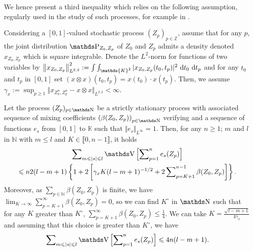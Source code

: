We hence present a third inequality which relies on the following assumption, regularly used in the study of such processes, for example in .

\begin{as}\label{AS_MARGINS_INTRO_DATA_REGULAR}
Considering a $[0, 1]$-valued stochastic process $(Z_{p})_{p \in \mathds{Z}}$, assume that for any $p$, the joint distribution $\P_{Z_{0}, Z_{p}}$ of $Z_{0}$ and $Z_{p}$ admits a density denoted $x_{Z_{0}, Z_{p}}$ which is square integrable.
Denote the $L^{2}$-norm for functions of two variables by
$\left\Vert x_{Z_{0}, Z_{p}}\right\Vert_{L^{2, 2}}^{2} := \int\int_{\mathds{K}^{2}} \vert x_{Z_{0}, Z_{p}}(t_{0}, t_{p})\vert^{2} \d t_{0} \d t_{p}$ and for any $t_{0}$ and $t_{p}$ in $[0, 1]$ set $(x \otimes x)(t_{0}, t_{p}) = x(t_{0}) \cdot x(t_{p})$.
Then, we assume $\gamma_{x} := \sup\nolimits_{p \geq 1} \Vert x_{Z_{0}^{n}, Z_{p}^{n}} - x \otimes x \Vert_{L^{2, 2}} < \infty$.
\assEnd
\end{as}

\begin{lm}\label{LM_DEPENDENTDATA_VARIANCEBOUNDIII}
Let the process $(Z_{p})_{p \in \N}$ be a strictly stationary process with associated sequence of mixing coefficients $\left(\beta(Z_{0}, Z_{p})\right)_{p \in \N}$ verifying  and a sequence of functions $e_{s}$ from $[0, 1]$ to $\mathds{K}$ such that $\Vert e_{s} \Vert_{L^{\infty}} = 1$.
Then, for any $n \geq 1$; $m$ and $l$ in $\mathds{N}$ with $m \leq l$ and $K \in \llbracket 0, n-1\rrbracket$, it holds
\begin{multline*}
\sum\nolimits_{m \leq \vert s \vert \leq l} \V\left[\sum\nolimits_{p = 1}^{n} e_{s}(Z_{p})\right]\\
\leq n 2 (l-m+1) \left\{1 + 2\left[\gamma_{x} K(l-m+1)^{-1/2} + 2 \sum\nolimits_{p = K + 1}^{n - 1} \beta(Z_{0}, Z_{p})\right]\right\}.
\end{multline*}
Moreover, as $\sum\nolimits_{p \in \mathds{N}} \beta(Z_{0}, Z_{p})$ is finite, we have $\lim\nolimits_{K \rightarrow \infty} \sum\nolimits_{p = K + 1}^{\infty} \beta(Z_{0}, Z_{p}) = 0$, so we can find $K^{\circ}$ in $\N$ such that for any $K$ greater than $K^{\circ}$, $\sum\nolimits_{p = K + 1}^{\infty} \beta(Z_{0}, Z_{p}) \leq \frac{1}{4}$.
We can take $K = \frac{\sqrt{l - m + 1}}{4 \gamma_{x}}$ and assuming that this choice is greater than $K^{\circ}$, we have
\[\sum\nolimits_{m \leq \vert s \vert \leq l} \V\left[\sum\nolimits_{p = 1}^{n} e_{s}(Z_{p})\right] \leq 4 n (l-m+1).\]
\reEnd
\end{lm}

